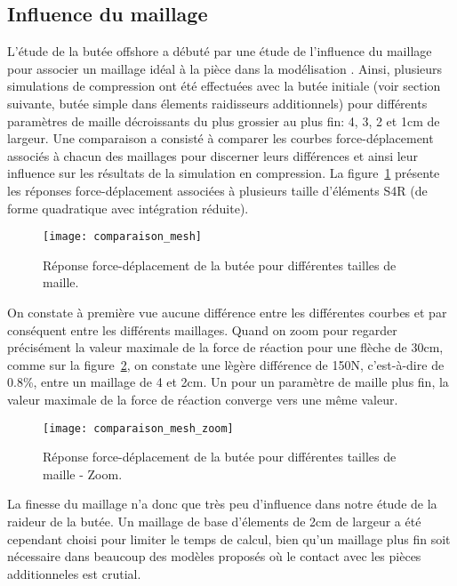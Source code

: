 ﻿\documentclass{article}
\newcommand{\abaqus}{\bsc{Abaqus}\xspace}
\newcommand{\cimg}{0.8}
\begin{document}
\subsection{Influence du maillage}

L'étude de la butée offshore a débuté par une étude de l'influence du maillage pour associer un maillage idéal à la pièce dans la modélisation \abaqus. Ainsi, plusieurs simulations de compression ont été effectuées avec la butée initiale (voir section suivante, butée simple dans élements raidisseurs additionnels) pour différents paramètres de maille décroissants du plus grossier au plus fin: 4, 3, 2 et 1cm de largeur.
Une comparaison a consisté à comparer les courbes force-déplacement associés à chacun des maillages pour discerner leurs différences et ainsi leur influence sur les résultats de la simulation en compression. La figure~\ref{fig1} présente les réponses force-déplacement associées à plusieurs taille d'éléments S4R (de forme quadratique avec intégration réduite).

\begin{figure}[!h]
	\centering
	\texttt{[image: comparaison\_mesh]}
	\caption{Réponse force-déplacement de la butée pour différentes tailles de maille.}
	\label{fig1}
\end{figure}


On constate à première vue aucune différence entre les différentes courbes et par conséquent entre les différents maillages. Quand on zoom pour regarder précisément la valeur maximale de la force de réaction pour une flèche de 30cm, comme sur la figure~\ref{fig2}, on constate une lègère différence de 150N, c'est-à-dire de 0.8\%, entre un maillage de 4 et 2cm. Un pour un paramètre de maille plus fin, la valeur maximale de la force de réaction converge vers une même valeur.

\begin{figure}[!h]
	\centering
	\texttt{[image: comparaison\_mesh\_zoom]}
	\caption{Réponse force-déplacement de la butée pour différentes tailles de maille - Zoom.}
	\label{fig2}
\end{figure}

La finesse du maillage n'a donc que très peu d'influence dans notre étude de la raideur de la butée. Un maillage de base d'élements de 2cm de largeur a été cependant choisi pour limiter le temps de calcul, bien qu'un maillage plus fin soit nécessaire dans beaucoup des modèles proposés où le contact avec les pièces additionneles est crutial.
\end{document}
